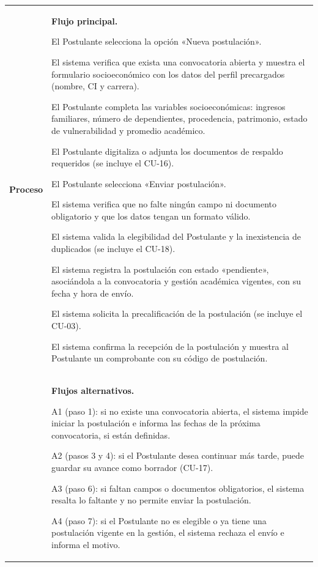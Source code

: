 \begin{longtable}{>{\raggedright\arraybackslash}p{2.9cm} >{\raggedright\arraybackslash}p{12.6cm}}
\midrule
\textbf{Proceso} & \textbf{Flujo principal.}
\begin{cupasos}
    \item El Postulante selecciona la opción «Nueva postulación».
    \item El sistema verifica que exista una convocatoria abierta y muestra el formulario socioeconómico con los datos del perfil precargados (nombre, CI y carrera).
    \item El Postulante completa las variables socioeconómicas: ingresos familiares, número de dependientes, procedencia, patrimonio, estado de vulnerabilidad y promedio académico.
    \item El Postulante digitaliza o adjunta los documentos de respaldo requeridos (se incluye el CU-16).
    \item El Postulante selecciona «Enviar postulación».
    \item El sistema verifica que no falte ningún campo ni documento obligatorio y que los datos tengan un formato válido.
    \item El sistema valida la elegibilidad del Postulante y la inexistencia de duplicados (se incluye el CU-18).
    \item El sistema registra la postulación con estado «pendiente», asociándola a la convocatoria y gestión académica vigentes, con su fecha y hora de envío.
    \item El sistema solicita la precalificación de la postulación (se incluye el CU-03).
    \item El sistema confirma la recepción de la postulación y muestra al Postulante un comprobante con su código de postulación.
\end{cupasos} \\
 & \textbf{Flujos alternativos.}
\begin{cuvin}
    \item A1 (paso 1): si no existe una convocatoria abierta, el sistema impide iniciar la postulación e informa las fechas de la próxima convocatoria, si están definidas.
    \item A2 (pasos 3 y 4): si el Postulante desea continuar más tarde, puede guardar su avance como borrador (CU-17).
    \item A3 (paso 6): si faltan campos o documentos obligatorios, el sistema resalta lo faltante y no permite enviar la postulación.
    \item A4 (paso 7): si el Postulante no es elegible o ya tiene una postulación vigente en la gestión, el sistema rechaza el envío e informa el motivo.

\end{cuvin}
\end{longtable}
